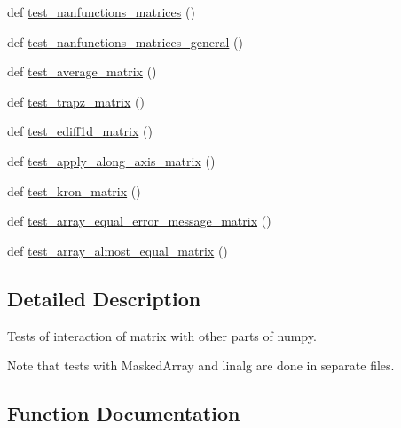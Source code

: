 \begin{DoxyCompactItemize}
\item 
def \hyperlink{namespacenumpy_1_1matrixlib_1_1tests_1_1test__interaction_af579d86fb8e2de3bb11dc4379a0fc1ee}{test\+\_\+nanfunctions\+\_\+matrices} ()
\item 
def \hyperlink{namespacenumpy_1_1matrixlib_1_1tests_1_1test__interaction_a499fadbc8f7b8677cc229d03d6ce8dde}{test\+\_\+nanfunctions\+\_\+matrices\+\_\+general} ()
\item 
def \hyperlink{namespacenumpy_1_1matrixlib_1_1tests_1_1test__interaction_ac534b6bed85f7ec7e450bd2f49c900ed}{test\+\_\+average\+\_\+matrix} ()
\item 
def \hyperlink{namespacenumpy_1_1matrixlib_1_1tests_1_1test__interaction_a18d1c5337e20d8c5ba053d14f481d263}{test\+\_\+trapz\+\_\+matrix} ()
\item 
def \hyperlink{namespacenumpy_1_1matrixlib_1_1tests_1_1test__interaction_a5a7e6f7402f9f7e5d611beb261e293f7}{test\+\_\+ediff1d\+\_\+matrix} ()
\item 
def \hyperlink{namespacenumpy_1_1matrixlib_1_1tests_1_1test__interaction_a0065bbd80a58742677ba2e2d49b79973}{test\+\_\+apply\+\_\+along\+\_\+axis\+\_\+matrix} ()
\item 
def \hyperlink{namespacenumpy_1_1matrixlib_1_1tests_1_1test__interaction_ad917bb91c86fb7335583edd5db715eea}{test\+\_\+kron\+\_\+matrix} ()
\item 
def \hyperlink{namespacenumpy_1_1matrixlib_1_1tests_1_1test__interaction_abd3680ad760b289d7ea014d669ce8c79}{test\+\_\+array\+\_\+equal\+\_\+error\+\_\+message\+\_\+matrix} ()
\item 
def \hyperlink{namespacenumpy_1_1matrixlib_1_1tests_1_1test__interaction_ad545f67c5f380fa51676d33570b6dd0a}{test\+\_\+array\+\_\+almost\+\_\+equal\+\_\+matrix} ()
\end{DoxyCompactItemize}


\subsection{Detailed Description}
\begin{DoxyVerb}Tests of interaction of matrix with other parts of numpy.

Note that tests with MaskedArray and linalg are done in separate files.
\end{DoxyVerb}
 

\subsection{Function Documentation}
\mbox{\label{namespacenumpy_1_1matrixlib_1_1tests_1_1test__interaction_a321d4978d6c3dbfde00f4a7c135b4e92}} 
